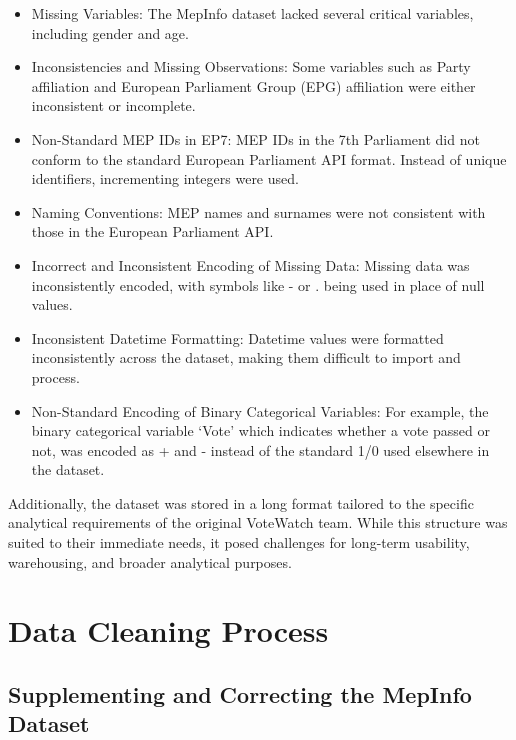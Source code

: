 \documentclass[a4paper,12pt]{report}
\begin{document}
    \begin{itemize}
        \item
        Missing Variables: The MepInfo dataset lacked several critical variables, including gender and age.
        \item
        Inconsistencies and Missing Observations: Some variables such as Party affiliation and European
        Parliament Group
        (EPG) affiliation were either inconsistent or incomplete.
        \item
        Non-Standard MEP IDs in EP7: MEP IDs in the 7th Parliament did not conform to the standard European
        Parliament
        API format.
        Instead of unique identifiers, incrementing integers were used.
        \item
        Naming Conventions: MEP names and surnames were not consistent with those in the European
        Parliament API.
        \item
        Incorrect and Inconsistent Encoding of Missing Data: Missing data was inconsistently encoded, with
        symbols like
        - or .
        being used in place of null values.
        \item
        Inconsistent Datetime Formatting: Datetime values were formatted inconsistently across the dataset,
        making them
        difficult to import and process.
        \item
        Non-Standard Encoding of Binary Categorical Variables: For example, the binary categorical variable
        `Vote'
        which indicates whether a vote passed or not, was encoded as + and - instead of the standard 1/0 used
        elsewhere
        in the dataset.
    \end{itemize}
    Additionally, the dataset was stored in a long format tailored to the specific analytical requirements of
    the
    original VoteWatch team.
    While this structure was suited to their immediate needs, it posed challenges for
    long-term
    usability, warehousing, and broader analytical purposes.


    \chapter{Data Cleaning Process}\label{ch:data-cleaning-process}


    \section{Supplementing and Correcting the MepInfo Dataset}
    \label{sec:supplementing-and-correcting-the-mepinfo-dataset}
\end{document}
